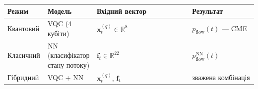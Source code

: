 \documentclass[12pt,a4paper]{article}
\begin{document}
{\def\LTcaptype{none} %

\begin{longtable}[]{@{}

  >{\raggedright\arraybackslash}p{0.1667\linewidth}

  >{\raggedright\arraybackslash}p{0.1905\linewidth}

  >{\raggedright\arraybackslash}p{0.3810\linewidth}

  >{\raggedright\arraybackslash}p{0.2619\linewidth}@{}}

\toprule\noalign{}

\begin{minipage}[b]{\linewidth}\raggedright

Режим

\end{minipage} & \begin{minipage}[b]{\linewidth}\raggedright

Модель

\end{minipage} & \begin{minipage}[b]{\linewidth}\raggedright

Вхідний вектор

\end{minipage} & \begin{minipage}[b]{\linewidth}\raggedright

Результат

\end{minipage} \\

\midrule\noalign{}

\endhead

\bottomrule\noalign{}

\endlastfoot

Квантовий & VQC (4 кубіти) & \(\mathbf{x}_t^{(q)} \in \mathbb{R}^8\) & \(p_{\text{flow}}(t)\) --- CME \\

Класичний & NN (класифікатор стану потоку) & \(\mathbf{f}_t \in \mathbb{R}^{22}\) & \(p_{\text{flow}}^{\text{NN}}(t)\) \\

Гібридний & VQC + NN & \(\mathbf{x}_t^{(q)}\), \(\mathbf{f}_t\) & зважена комбінація \\

\end{longtable}

}
\end{document}
